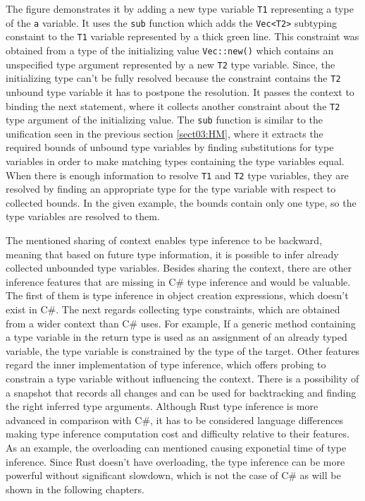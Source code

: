 The figure demonstrates it by adding a new type variable \texttt{T1} representing a type of the \texttt{a} variable.
It uses the \texttt{sub} function which adds the \texttt{Vec<T2>} subtyping constaint to the \texttt{T1} variable represented by a thick green line.
This constraint was obtained from a type of the initializing value \texttt{Vec::new()} which contains an unspecified type argument represented by a new \texttt{T2} type variable.
Since, the initializing type can't be fully resolved because the constraint contains the \texttt{T2} unbound type variable it has to postpone the resolution. 
It passes the context to binding the next statement, where it collects another constraint about the \texttt{T2} type argument of the initializing value.
The \texttt{sub} function is similar to the unification seen in the previous section \ref{sect03:HM}, where it extracts the required bounds of unbound type variables by finding substitutions for type variables in order to make matching types containing the type variables equal.
When there is enough information to resolve \texttt{T1} and \texttt{T2} type variables, they are resolved by finding an appropriate type for the type variable with respect to collected bounds.
In the given example, the bounds contain only one type, so the type variables are resolved to them.
\par
The mentioned sharing of context enables type inference to be backward, meaning that based on future type information, it is possible to infer already collected unbounded type variables. 
Besides sharing the context, there are other inference features that are missing in C\# type inference and would be valuable. 
The first of them is type inference in object creation expressions, which doesn't exist in C\#. 
The next regards collecting type constraints, which are obtained from a wider context than C\# uses. 
For example, If a generic method containing a type variable in the return type is used as an assignment of an already typed variable, the type variable is constrained by the type of the target. Other features regard the inner implementation of type inference, which offers probing to constrain a type variable without influencing the context. 
There is a possibility of a snapshot that records all changes and can be used for backtracking and finding the right inferred type arguments.
Although Rust type inference is more advanced in comparison with C\#, it has to be considered language differences making type inference computation cost and difficulty relative to their features. 
As an example, the overloading can mentioned causing exponetial time of type inference. 
Since Rust doesn't have overloading, the type inference can be more powerful without significant slowdown, which is not the case of C\# as will be shown in the following chapters.

